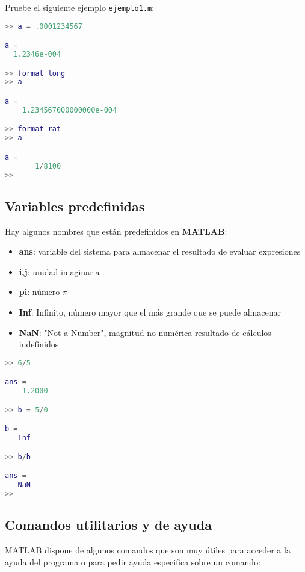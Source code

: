 \noindent
Pruebe el siguiente ejemplo \texttt{ejemplo1.m}:

\begin{lstlisting}[language=Matlab]
>> a = .0001234567

a =
  1.2346e-004

>> format long
>> a

a =
    1.234567000000000e-004

>> format rat
>> a

a =
       1/8100  
>> 
\end{lstlisting}

\subsection{Variables predefinidas}

Hay algunos nombres que están predefinidos en \textbf{MATLAB}:

\begin{itemize}
\item \textbf{ans}: variable del sistema para almacenar el resultado de evaluar expresiones
\item \textbf{i,j}: unidad imaginaria
\item \textbf{pi}: número $\pi$
\item \textbf{Inf}: Infinito, número mayor que el más grande que se puede almacenar
\item \textbf{NaN}: "Not a Number", magnitud no numérica resultado de cálculos indefinidos
\end{itemize}

\begin{lstlisting}[language=Matlab]
>> 6/5

ans =
    1.2000

>> b = 5/0

b =
   Inf

>> b/b

ans =
   NaN
>> 
\end{lstlisting}

\subsection{Comandos utilitarios y de ayuda}

MATLAB dispone de algunos comandos que son muy útiles para acceder a la ayuda del programa o para pedir ayuda especifica sobre un comando:

